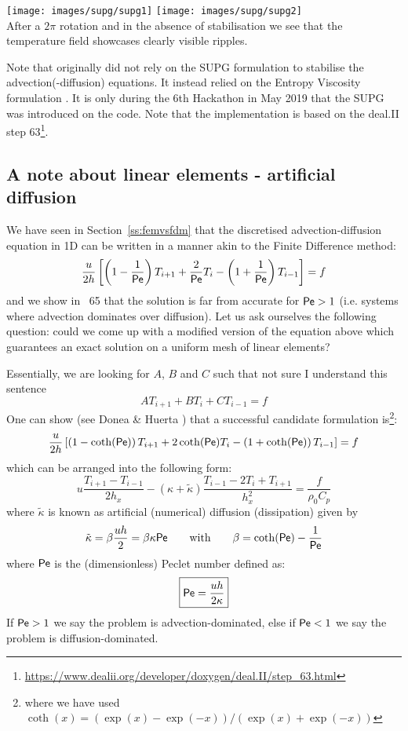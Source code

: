 \begin{center}
\texttt{[image: images/supg/supg1]}
\texttt{[image: images/supg/supg2]}\\
{\captionfont After a $2\pi$ rotation and in the absence of stabilisation we see that the temperature field
showcases clearly visible ripples.}
\end{center}

\begin{remark}
Note that \aspect{} originally did not rely on the SUPG formulation to stabilise the 
advection(-diffusion) equations\cite{krhb12}. It instead relied on the Entropy Viscosity
formulation \cite{gupp10,gupp11}.
It is only during the 6th Hackathon in May 2019 that the SUPG was introduced on the code.
Note that the \aspect{} implementation is based on the deal.II step 
63\footnote{\url{https://www.dealii.org/developer/doxygen/deal.II/step_63.html}}.
\end{remark}


\subsection{A note about linear elements - artificial diffusion}

We have seen in Section~\ref{ss:femvsfdm} that the discretised advection-diffusion equation 
in 1D can be written in a manner akin to the Finite Difference method:
\[
\frac{u}{2h}
\left[
\left(1-\frac{1}{{\mathsf{Pe}}}\right) T_{i+1} + \frac{2}{{\mathsf{Pe}}} T_i - \left(1+\frac{1}{{\mathsf{Pe}}}\right)T_{i-1} 
\right] = f
\]
and we show in \stone~65 that the solution is far from accurate for ${\mathsf{Pe}}>1$ (i.e. systems where advection 
dominates over diffusion). Let us ask ourselves the 
following question: could we come up with a modified version of the equation above which 
guarantees an exact solution on a uniform mesh of linear elements?

Essentially, we are looking for $A$, $B$ and $C$ such that 
{\color{red} not sure I understand this sentence} 
\[
A T_{i+1} + BT_i + C T_{i-1} = f
\]
One can show (see Donea \& Huerta \cite{dohu03}) that a successful 
candidate formulation is\footnote{where we have used $\coth(x)=(\exp(x)-\exp(-x))/(\exp(x)+\exp(-x))$}:
\[
\frac{u}{2h}
\left[
\left(1-\coth({\mathsf{Pe}}) \right) T_{i+1} + 2 \coth({\mathsf{Pe}}) T_i - \left(1+\coth({\mathsf{Pe}})\right) T_{i-1} 
\right] = f
\]
which can be arranged into the following form:
\begin{equation}
u
\frac{T_{i+1}-T_{i-1}}{2h_x}
-
(\kappa+ \tilde{\kappa})
\frac{T_{i-1}-2T_i+T_{i+1}}{h_x^2}
= \frac{f}{\rho_0 C_p}
\end{equation}
where 
$\tilde{\kappa}$ is known as artificial (numerical) diffusion (dissipation) given by
\[
\tilde{\kappa}=\beta \frac{u h}{2} = \beta \kappa {\mathsf{Pe}}
\qquad
\text{with}
\qquad
\beta = \coth ({\mathsf{Pe}}) - \frac{1}{{\mathsf{Pe}}}
\]
where ${\mathsf{Pe}}$ is the (dimensionless) Peclet number defined as: 
\[
\boxed{
{\mathsf{Pe}}= \frac{u h }{2 \kappa}
}
\]
If ${\mathsf{Pe}}>1$ we say the problem is advection-dominated, 
else if ${\mathsf{Pe}}<1$ we say the problem is diffusion-dominated.


